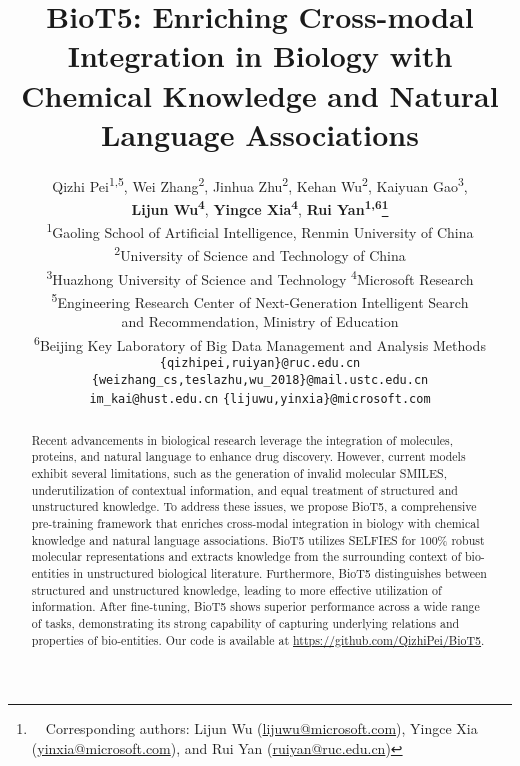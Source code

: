 \documentclass[11pt]{article}
\title{BioT5: Enriching Cross-modal Integration in Biology with Chemical Knowledge and Natural Language Associations}
\author{
    Qizhi Pei\textsuperscript{1,5}, 
    Wei Zhang\textsuperscript{2}, 
    Jinhua Zhu\textsuperscript{2}, 
    Kehan Wu\textsuperscript{2},
    Kaiyuan Gao\textsuperscript{3}, \\
    {\bf Lijun Wu\textsuperscript{4}},
    {\bf Yingce Xia\textsuperscript{4}},
    {\bf Rui Yan\textsuperscript{1,6}\thanks{\ \ Corresponding authors: Lijun Wu (\url{lijuwu@microsoft.com}), Yingce Xia (\url{yinxia@microsoft.com}), and Rui Yan (\url{ruiyan@ruc.edu.cn})}} \\
    \textsuperscript{1}Gaoling School of Artificial Intelligence, Renmin University of China \\
    \textsuperscript{2}University of Science and Technology of China \\
    \textsuperscript{3}Huazhong University of Science and Technology \quad
    \textsuperscript{4}Microsoft Research\\
    \textsuperscript{5}Engineering Research Center of Next-Generation Intelligent Search\\ and Recommendation, Ministry of Education \\
    \textsuperscript{6}Beijing Key Laboratory of Big Data Management and Analysis Methods \\
    \texttt{\{qizhipei,ruiyan\}@ruc.edu.cn} \\
    \texttt{\{weizhang\_cs,teslazhu,wu\_2018\}@mail.ustc.edu.cn} \\
    \texttt{im\_kai@hust.edu.cn} \quad
    \texttt{\{lijuwu,yinxia\}@microsoft.com} 
}
\begin{document}
\maketitle
\begin{abstract}
Recent advancements in biological research leverage the integration of molecules, proteins, and natural language to enhance drug discovery. However, current models exhibit several limitations, such as the generation of invalid molecular SMILES, underutilization of contextual information, and equal treatment of structured and unstructured knowledge. To address these issues, we propose BioT5, a comprehensive pre-training framework that enriches cross-modal integration in biology with chemical knowledge and natural language associations. BioT5 utilizes SELFIES for 100\% robust molecular representations and extracts knowledge from the surrounding context of bio-entities in unstructured biological literature. Furthermore, BioT5 distinguishes between structured and unstructured knowledge, leading to more effective utilization of information. After fine-tuning, BioT5 shows superior performance across a wide range of tasks, demonstrating its strong capability of capturing underlying relations and properties of bio-entities. Our code is available at \url{https://github.com/QizhiPei/BioT5}.
\end{abstract}
\end{document}
